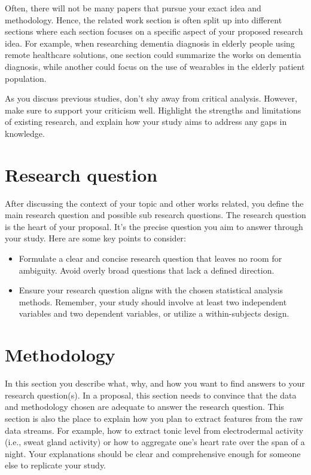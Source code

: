 \documentclass[10pt,a4paper]{article}
\begin{document}
Often, there will not be many papers that pursue your exact idea and methodology. Hence, the related work section is often split up into different sections where each section focuses on a specific aspect of your proposed research idea. For example, when researching dementia diagnosis in elderly people using remote healthcare solutions, one section could summarize the works on dementia diagnosis, while another could focus on the use of wearables in the elderly patient population. 

As you discuss previous studies, don't shy away from critical analysis. However, make sure to support your criticism well. Highlight the strengths and limitations of existing research, and explain how your study aims to address any gaps in knowledge. 

\section{Research question}\label{sec:researchquestion}
After discussing the context of your topic and other works related, you define the main research question and possible sub research questions. The research question is the heart of your proposal. It's the precise question you aim to answer through your study. Here are some key points to consider:

\begin{itemize}
    \item Formulate a clear and concise research question that leaves no room for ambiguity. Avoid overly broad questions that lack a defined direction.
    \item Ensure your research question aligns with the chosen statistical analysis methods. Remember, your study should involve at least two independent variables and two dependent variables, or utilize a within-subjects design.
\end{itemize}

\section{Methodology}\label{sec:methods}
In this section you describe what, why, and how you want to find answers to your research question(s). In a proposal, this section needs to convince that the data and methodology chosen are adequate to answer the research question. This section is also the place to explain how you plan to extract features from the raw data streams. For example, how to extract tonic level from electrodermal activity (i.e., sweat gland activity) or how to aggregate one's heart rate over the span of a night. Your explanations should be clear and comprehensive enough for someone else to replicate your study. 
\end{document}
